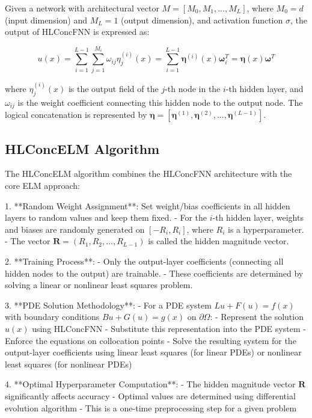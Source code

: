 \documentclass[11pt,a4paper]{article}
\begin{document}
Given a network with architectural vector $M = [M_0, M_1, ..., M_L]$, where $M_0 = d$ (input dimension) and $M_L = 1$ (output dimension), and activation function $\sigma$, the output of HLConcFNN is expressed as:

\begin{equation}
u(x) = \sum_{i=1}^{L-1} \sum_{j=1}^{M_i} \omega_{ij} \eta_j^{(i)}(x) = \sum_{i=1}^{L-1} \boldsymbol{\eta}^{(i)}(x)\boldsymbol{\omega}_i^T = \boldsymbol{\eta}(x)\boldsymbol{\omega}^T
\end{equation}

where $\eta_j^{(i)}(x)$ is the output field of the $j$-th node in the $i$-th hidden layer, and $\omega_{ij}$ is the weight coefficient connecting this hidden node to the output node. The logical concatenation is represented by $\boldsymbol{\eta} = [\boldsymbol{\eta}^{(1)}, \boldsymbol{\eta}^{(2)}, ..., \boldsymbol{\eta}^{(L-1)}]$.

\subsection{HLConcELM Algorithm}

The HLConcELM algorithm combines the HLConcFNN architecture with the core ELM approach:

1. **Random Weight Assignment**: Set weight/bias coefficients in all hidden layers to random values and keep them fixed.
   - For the $i$-th hidden layer, weights and biases are randomly generated on $[-R_i, R_i]$, where $R_i$ is a hyperparameter.
   - The vector $\mathbf{R} = (R_1, R_2, ..., R_{L-1})$ is called the hidden magnitude vector.

2. **Training Process**:
   - Only the output-layer coefficients (connecting all hidden nodes to the output) are trainable.
   - These coefficients are determined by solving a linear or nonlinear least squares problem.

3. **PDE Solution Methodology**:
   - For a PDE system $Lu + F(u) = f(x)$ with boundary conditions $Bu + G(u) = g(x)$ on $\partial\Omega$:
     - Represent the solution $u(x)$ using HLConcFNN
     - Substitute this representation into the PDE system
     - Enforce the equations on collocation points
     - Solve the resulting system for the output-layer coefficients using linear least squares (for linear PDEs) or nonlinear least squares (for nonlinear PDEs)

4. **Optimal Hyperparameter Computation**:
   - The hidden magnitude vector $\mathbf{R}$ significantly affects accuracy
   - Optimal values are determined using differential evolution algorithm
   - This is a one-time preprocessing step for a given problem
\end{document}

